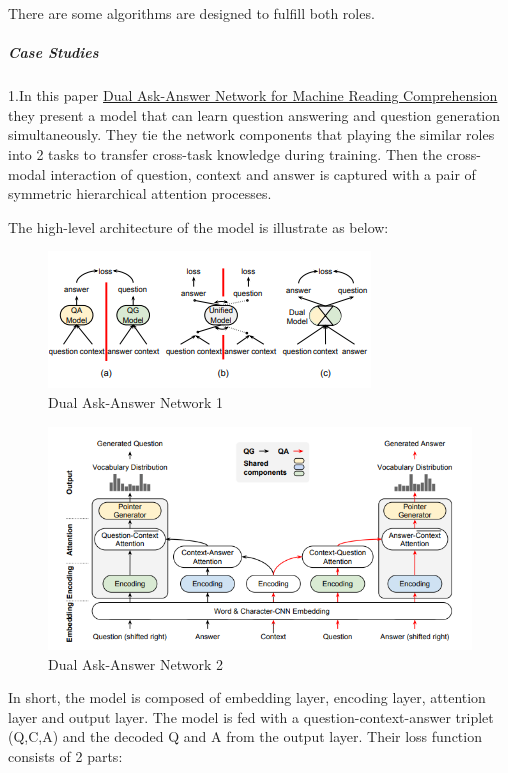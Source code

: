 \documentclass[]{book}
\let\oldsubparagraph\subparagraph
\renewcommand{\subparagraph}[1]{\oldsubparagraph{#1}\mbox{}}
\theoremstyle{definition}
\theoremstyle{definition}
\theoremstyle{definition}
\theoremstyle{remark}
\begin{document}
There are some algorithms are designed to fulfill both roles.

\subparagraph{Case Studies}\label{case-studies-3}

1.In this paper \href{https://arxiv.org/pdf/1809.01997.pdf}{Dual
Ask-Answer Network for Machine Reading Comprehension} they present a
model that can learn question answering and question generation
simultaneously. They tie the network components that playing the similar
roles into 2 tasks to transfer cross-task knowledge during training.
Then the cross-modal interaction of question, context and answer is
captured with a pair of symmetric hierarchical attention processes.

The high-level architecture of the model is illustrate as below:

\begin{figure}
\centering
\includegraphics{img/qgqa.png}
\caption{Dual Ask-Answer Network 1}
\end{figure}

\begin{figure}
\centering
\includegraphics{img/daan.png}
\caption{Dual Ask-Answer Network 2}
\end{figure}

In short, the model is composed of embedding layer, encoding layer,
attention layer and output layer. The model is fed with a
question-context-answer triplet (Q,C,A) and the decoded Q and A from the
output layer. Their loss function consists of 2 parts:
\end{document}
